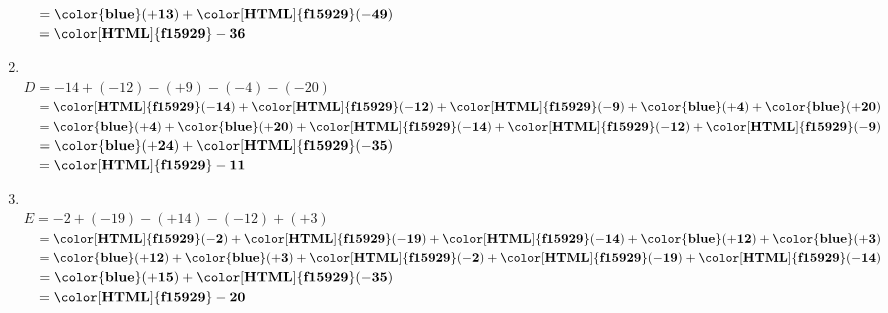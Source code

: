 \begin{corrige}
\begin{multicols}
\begin{enumerate}
            $ \phantom{A}= \mathbf{{\color{blue}(+13)}}+\mathbf{{\color[HTML]{f15929}(-49)}} $\\
            $ \phantom{A}= \mathbf{{\color[HTML]{f15929}-36}} $\\
            \columnbreak
            \item \phantom{rrr}\\
            $ D =  -14+(-12)-(+9)-(-4)-(-20)$\\
            $ \phantom{A}= \mathbf{{\color[HTML]{f15929}(-14)}}+\mathbf{{\color[HTML]{f15929}(-12)}}+\mathbf{{\color[HTML]{f15929}(-9)}}+\mathbf{{\color{blue}(+4)}}+\mathbf{{\color{blue}(+20)}} $\\
            $ \phantom{A}= \mathbf{{\color{blue}(+4)}}+\mathbf{{\color{blue}(+20)}}+\mathbf{{\color[HTML]{f15929}(-14)}}+\mathbf{{\color[HTML]{f15929}(-12)}}+\mathbf{{\color[HTML]{f15929}(-9)}} $\\
            $ \phantom{A}= \mathbf{{\color{blue}(+24)}}+\mathbf{{\color[HTML]{f15929}(-35)}} $\\
            $ \phantom{A}= \mathbf{{\color[HTML]{f15929}-11}} $\\
            \item \phantom{rrr}\\
            $ E =  -2+(-19)-(+14)-(-12)+(+3)$\\
            $ \phantom{A}= \mathbf{{\color[HTML]{f15929}(-2)}}+\mathbf{{\color[HTML]{f15929}(-19)}}+\mathbf{{\color[HTML]{f15929}(-14)}}+\mathbf{{\color{blue}(+12)}}+\mathbf{{\color{blue}(+3)}} $\\
            $ \phantom{A}= \mathbf{{\color{blue}(+12)}}+\mathbf{{\color{blue}(+3)}}+\mathbf{{\color[HTML]{f15929}(-2)}}+\mathbf{{\color[HTML]{f15929}(-19)}}+\mathbf{{\color[HTML]{f15929}(-14)}} $\\
            $ \phantom{A}= \mathbf{{\color{blue}(+15)}}+\mathbf{{\color[HTML]{f15929}(-35)}} $\\
            $ \phantom{A}= \mathbf{{\color[HTML]{f15929}-20}} $
        \end{enumerate}
    \end{multicols}
\end{corrige}